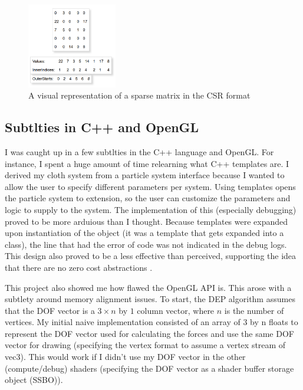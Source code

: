 \documentclass[letterpaper, 10 pt, conference]{ieeeconf}  %
\begin{document}
\begin{figure}
        \centering
        \includegraphics[width=0.35\textwidth]{spmat.PNG}
        \caption{A visual representation of a sparse matrix in the CSR format} \label{fig:sparse_matrix}
\end{figure}





\subsection{Subtlties in C++ and OpenGL}
        I was caught up in a few subtlties in the C++ language and OpenGL. For instance, I spent a huge amount of time relearning what C++ templates are. I derived my cloth system from a particle system interface because I wanted to allow the user to specify different parameters per system. Using templates opens the particle system to extension, so the user can customize the parameters and logic to supply to the system. The implementation of this (especially debugging) proved to be more arduious than I thought. Because templates were expanded upon instantiation of the object (it was a template that gets expanded into a class), the line that had the error of code was not indicated in the debug logs. This design also proved to be a less effective than perceived, supporting the idea that there are no zero cost abstractions \cite{caruth2019}. 

        This project also showed me how flawed the OpenGL API is. This arose with a subtlety around memory alignment issues. To start, the DEP algorithm assumes that the DOF vector is a $ 3 \times n $ by $ 1 $ column vector, where $n$ is the number of vertices. My initial naive implementation consisted of an array of 3 by n floats to represent the DOF vector used for calculating the forces and use the same DOF vector for drawing (specifying the vertex format to assume a vertex stream of vec3). This would work if I didn't use my DOF vector in the other (compute/debug) shaders (specifying the DOF vector as a shader buffer storage object (SSBO)).
\end{document}
